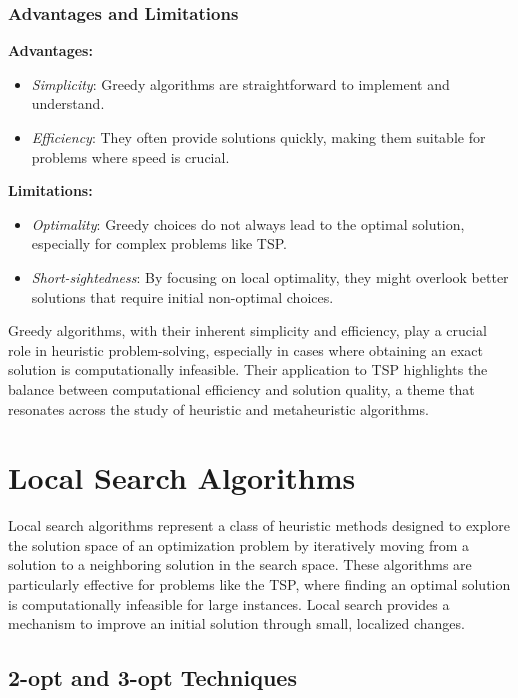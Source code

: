 
\subsubsection{Advantages and Limitations}

\textbf{Advantages:}
\begin{itemize}
	\item \textit{Simplicity}: Greedy algorithms are straightforward to implement and understand.
	\item \textit{Efficiency}: They often provide solutions quickly, making them suitable for problems where speed is crucial.
\end{itemize}

\textbf{Limitations:}
\begin{itemize}
	\item \textit{Optimality}: Greedy choices do not always lead to the optimal solution, especially for complex problems like TSP.
	\item \textit{Short-sightedness}: By focusing on local optimality, they might overlook better solutions that require initial non-optimal choices.
\end{itemize}

Greedy algorithms, with their inherent simplicity and efficiency, play a crucial role in heuristic problem-solving, especially in cases where obtaining an exact solution is computationally infeasible. Their application to TSP highlights the balance between computational efficiency and solution quality, a theme that resonates across the study of heuristic and metaheuristic algorithms.

\section{Local Search Algorithms}

Local search algorithms represent a class of heuristic methods designed to explore the solution space of an optimization problem by iteratively moving from a solution to a neighboring solution in the search space. These algorithms are particularly effective for problems like the TSP, where finding an optimal solution is computationally infeasible for large instances. Local search provides a mechanism to improve an initial solution through small, localized changes.

\subsection{2-opt and 3-opt Techniques}

